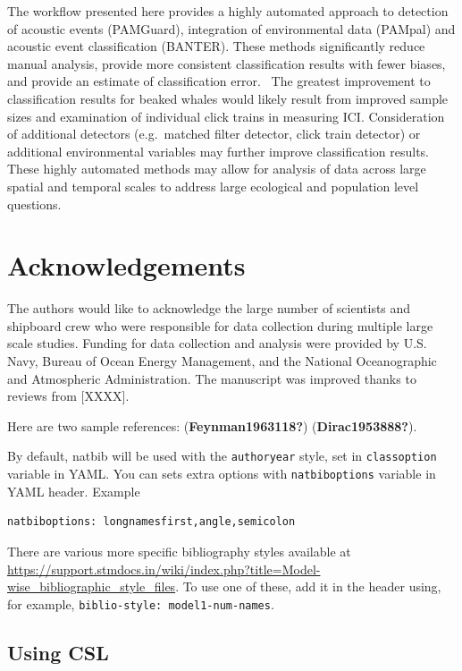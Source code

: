 \documentclass[
  letterpaper,
  DIV=11,
  numbers=noendperiod]{scrartcl}
\begin{document}
The workflow presented here provides a highly automated approach to
detection of acoustic events (PAMGuard), integration of environmental
data (PAMpal) and acoustic event classification (BANTER). These methods
significantly reduce manual analysis, provide more consistent
classification results with fewer biases, and provide an estimate of
classification error.~ The greatest improvement to classification
results for beaked whales would likely result from improved sample sizes
and examination of individual click trains in measuring ICI.
Consideration of additional detectors (e.g.~matched filter detector,
click train detector) or additional environmental variables may further
improve classification results. These highly automated methods may allow
for analysis of data across large spatial and temporal scales to address
large ecological and population level questions.

\hypertarget{acknowledgements}{%
\section{Acknowledgements}\label{acknowledgements}}

The authors would like to acknowledge the large number of scientists and
shipboard crew who were responsible for data collection during multiple
large scale studies. Funding for data collection and analysis were
provided by U.S. Navy, Bureau of Ocean Energy Management, and the
National Oceanographic and Atmospheric Administration. The manuscript
was improved thanks to reviews from {[}XXXX{]}.

Here are two sample references: (\textbf{Feynman1963118?})
(\textbf{Dirac1953888?}).

By default, natbib will be used with the \texttt{authoryear} style, set
in \texttt{classoption} variable in YAML. You can sets extra options
with \texttt{natbiboptions} variable in YAML header. Example

\begin{verbatim}
natbiboptions: longnamesfirst,angle,semicolon
\end{verbatim}

There are various more specific bibliography styles available at
\url{https://support.stmdocs.in/wiki/index.php?title=Model-wise_bibliographic_style_files}.
To use one of these, add it in the header using, for example,
\texttt{biblio-style:\ model1-num-names}.

\hypertarget{using-csl}{%
\subsection{Using CSL}\label{using-csl}}
\end{document}
